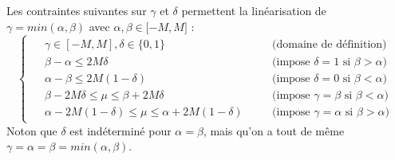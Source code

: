 \documentclass[a4paper,12pt]{article}
\begin{document}
\begin {enumerate}
{    Les contraintes suivantes sur $\gamma$ et $\delta$ permettent la linéarisation de $ \gamma = min(\alpha, \beta)$ avec $\alpha, \beta \in \lbrack -M, M \rbrack$ : 
    \begin{equation*}
        \begin{cases}
            \begin{alignedat}{2}
                &\gamma \in [-M,M], \delta \in \lbrace 0,1 \rbrace && \quad \text{(domaine de définition)} \\ 
                &\beta - \alpha \leq 2M \delta && \quad \text{(impose } \delta = 1 \text{ si }  \beta > \alpha \text{)}\\
                &\alpha - \beta \leq 2M(1-\delta) && \quad \text{(impose } \delta = 0 \text{ si }  \beta < \alpha \text{)}\\
                &\beta - 2M\delta \leq \mu \leq \beta + 2M\delta && \quad \text{(impose } \gamma = \beta \text{ si }  \beta < \alpha \text{)}\\
                &\alpha - 2M(1-\delta) \leq \mu \leq \alpha + 2M(1-\delta) && \quad \text{(impose } \gamma = \alpha \text{ si }  \beta > \alpha \text{)}
            \end{alignedat}
        \end{cases}
    \end{equation*}
    Noton que $\delta$ est indéterminé pour $\alpha = \beta$, mais qu'on a tout de même $\gamma = \alpha = \beta = min(\alpha, \beta)$.
    
}
\end{enumerate}
\end{document}
